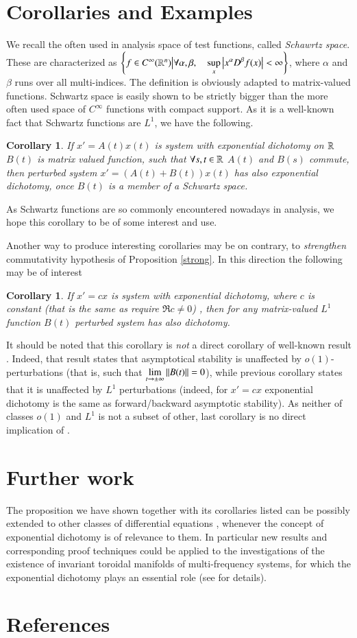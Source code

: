 \documentclass{elsarticle}
\newtheorem{corollary}[proposition]{Corollary}
\theoremstyle{remark}
\begin{document}
\section{Corollaries and Examples}
We recall the often used in analysis space of test functions, called \textit{Schawrtz space}. These are characterized
as $\mysetn{f\in C^{\infty}(\mathbb{R}^n)}{\forall \alpha,\beta,\quad\sup_x\myabs{x^\alpha D^\beta f(x)}<\infty}$,
where $\alpha$ and $\beta$ runs over all multi-indices. The definition is obviously adapted to matrix-valued functions.
Schwartz space is easily shown to be strictly bigger than the more often used space of $C^\infty$ functions with compact support.
As it is a well-known fact that Schwartz functions are $L^1$, we have the following.
\begin{corollary}
	If $x'=A(t)x(t)$ is system with exponential dichotomy on $\mathbb{R}$ $B(t)$ is matrix valued function, such that $\forall s,t\in\mathbb{R}$
	$A(t)$ and $B(s)$ commute, then perturbed system $x'=(A(t)+B(t))x(t)$ has also exponential dichotomy, once $B(t)$ is a member
	of a Schwartz space.
\end{corollary}
As Schwartz functions are so commonly encountered nowadays in analysis, we hope this corollary to be of some interest and use.

Another way to produce interesting corollaries may be on contrary, to \textit{strengthen} commutativity hypothesis of Proposition
\ref{strong}. In this direction the following may be of interest
\begin{corollary}
	If $x'=cx$ is system with exponential dichotomy, where $c$ is constant (that is the same as require $\Re c\neq0$)
	, then for \textit{any} matrix-valued $L^1$ function $B(t)$ perturbed system has also dichotomy.
\end{corollary}
It should be noted that this corollary is \textit{not} a direct corollary of well-known result 
\cite[Corollary 3.21]{teschlordinary}. Indeed, that result states that asymptotical stability is unaffected by 
$o(1)$-perturbations (that is, such that $\lim_{t\to\pm\infty}\mynorm{B(t)}=0$), while previous corollary states that
it is unaffected by $L^1$ perturbations (indeed, for $x'=cx$ exponential dichotomy is the same as forward/backward asymptotic
stability). As neither of classes $o(1)$ and $L^1$ is not a subset of other, last corollary is no direct implication of
\cite[Corollary 3.21]{teschlordinary}.
\section{Further work}%
The proposition we have shown together with its corollaries listed can be possibly extended to other classes of differential equations
, whenever the concept of exponential dichotomy is of relevance to them. In particular new results and corresponding proof techniques
could be applied to the investigations of the existence of invariant toroidal manifolds of multi-frequency systems, for
 which the exponential dichotomy plays an essential role (see \cite{samoilenko2012elements,mitropolsky2002dichotomies} for details).
\section*{References}

\end{document}
